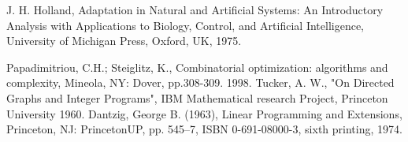 \documentclass[11pt]{article}
\begin{document}
\begin{thebibliography}{10}
  J. H. Holland,
  Adaptation in Natural and Artificial Systems: An
Introductory Analysis with Applications to Biology, Control, and
Artificial Intelligence, University of Michigan Press, Oxford, UK,
1975.

 Papadimitriou, C.H.; Steiglitz, K., Combinatorial optimization: algorithms and complexity, Mineola, NY: Dover, pp.308-309.
1998.
 Tucker, A. W., "On Directed Graphs and Integer Programs", IBM Mathematical research Project, Princeton University
1960.
 Dantzig, George B. (1963), Linear Programming and Extensions, Princeton, NJ: PrincetonUP, pp. 545–7, ISBN 0-691-08000-3, sixth printing, 1974.

\end{thebibliography}
\end{document}
